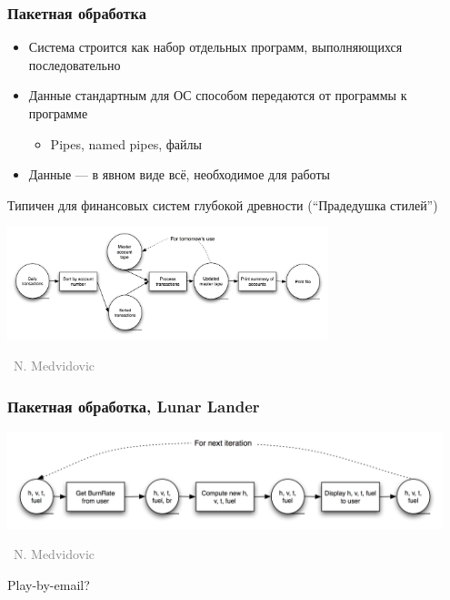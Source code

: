 \documentclass[xetex,mathserif,serif]{beamer}
\newcommand{\attribution}[1] {
	\vspace{-5mm}\begin{flushright}\begin{scriptsize}\textcolor{gray}{\textcopyright\, #1}\end{scriptsize}\end{flushright}
}
\begin{document}
	\begin{frame}
		\frametitle{Пакетная обработка}
		\begin{itemize}
			\item Система строится как набор отдельных программ, выполняющихся последовательно
			\item Данные стандартным для ОС способом передаются от программы к программе
			\begin{itemize}
				\item Pipes, named pipes, файлы
			\end{itemize}
			\item Данные --- в явном виде всё, необходимое для работы
		\end{itemize}
		Типичен для финансовых систем глубокой древности (``Прадедушка стилей'')
		\begin{center}
			\includegraphics[width=0.7\textwidth]{batch.png}
			\attribution{N. Medvidovic}
		\end{center}
	\end{frame}

	\begin{frame}
		\frametitle{Пакетная обработка, Lunar Lander}
		\begin{center}
			\includegraphics[width=0.95\textwidth]{batchLL.png}
			\attribution{N. Medvidovic}
		\end{center}
		Play-by-email?
	\end{frame}
\end{document}
